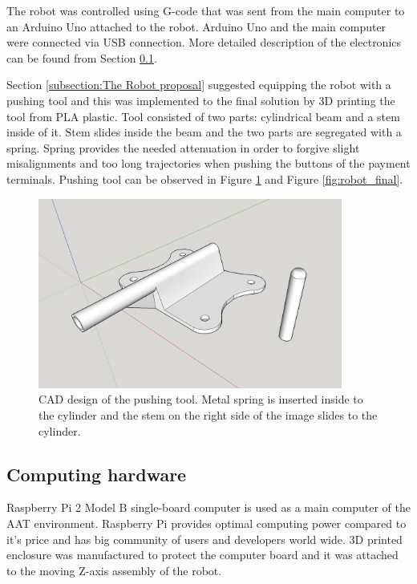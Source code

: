 The robot was controlled using G-code that was sent from the main computer to an Arduino Uno attached to the robot. Arduino Uno and the main computer were connected via USB connection. More detailed description of the electronics can be found from Section \ref{subsection:Computing hardware}.

Section \ref{subsection:The Robot proposal} suggested equipping the robot with a pushing tool and this was implemented to the final solution by 3D printing the tool from PLA plastic. Tool consisted of two parts: cylindrical beam and a stem inside of it. Stem slides inside the beam and the two parts are segregated with a spring. Spring provides the needed attenuation in order to forgive slight misalignments and too long trajectories when pushing the buttons of the payment terminals. Pushing tool can be observed in Figure \ref{fig:pushing_tool} and Figure \ref{fig:robot_final}.

\begin{figure}[ht]
  \begin{center}
    \includegraphics[width=10cm]{images/pushing_tool.png}
    \caption{CAD design of the pushing tool. Metal spring is inserted inside to the cylinder and the stem on the right side of the image slides to the cylinder.}
    \label{fig:pushing_tool}
  \end{center}
\end{figure}
\FloatBarrier

\subsection{Computing hardware}
\label{subsection:Computing hardware}

Raspberry Pi 2 Model B single-board computer is used as a main computer of the AAT environment. Raspberry Pi provides optimal computing power compared to it's price and has big community of users and developers world wide. 3D printed enclosure was manufactured to protect the computer board and it was attached to the moving Z-axis assembly of the robot.

